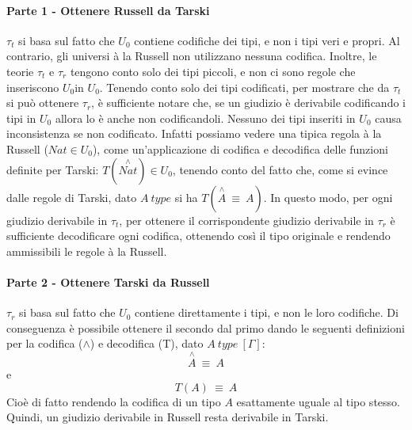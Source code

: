 \paragraph{Parte 1 - Ottenere Russell da Tarski}
$\tau_t$ si basa sul fatto che $U_0$ contiene codifiche dei tipi, e non i tipi veri e propri. Al contrario, gli universi à la Russell non utilizzano nessuna codifica. Inoltre, le teorie $\tau_t$ e $\tau_r$ tengono conto solo dei tipi piccoli, e non ci sono regole che inseriscono $U_0$in $U_0$. Tenendo conto solo dei tipi codificati, per mostrare che da $\tau_t$ si può ottenere $\tau_r$, è sufficiente notare che, se un giudizio è derivabile codificando i tipi in $U_0$ allora lo è anche non codificandoli. Nessuno dei tipi inseriti in $U_0$ causa inconsistenza se non codificato. Infatti possiamo vedere una tipica regola à la Russell ($Nat\in U_0$), come un'applicazione di codifica e decodifica delle funzioni definite per Tarski: $T(\stackrel{\wedge}{Nat})\in U_0$, tenendo conto del fatto che, come si evince dalle regole di Tarski, dato $A~type$ si ha $T(\stackrel{\wedge}{A}~\equiv~A)$. In questo modo, per ogni giudizio derivabile in $\tau_t$, per ottenere il corrispondente giudizio derivabile in $\tau_r$ è sufficiente decodificare ogni codifica, ottenendo così il tipo originale e rendendo ammissibili le regole à la Russell.

\paragraph{Parte 2 - Ottenere Tarski da Russell}
$\tau_r$ si basa sul fatto che $U_0$ contiene direttamente i tipi, e non le loro codifiche. Di conseguenza è possibile ottenere il secondo dal primo dando le seguenti definizioni per la codifica ($\wedge$) e decodifica (T), dato $A~type~[\Gamma]$:
\[\stackrel{\wedge}{A}~\equiv~A\] e 
\[T(A)~\equiv~A\]
Cioè di fatto rendendo la codifica di un tipo $A$ esattamente uguale al tipo stesso. Quindi, un giudizio derivabile in Russell resta derivabile in Tarski.